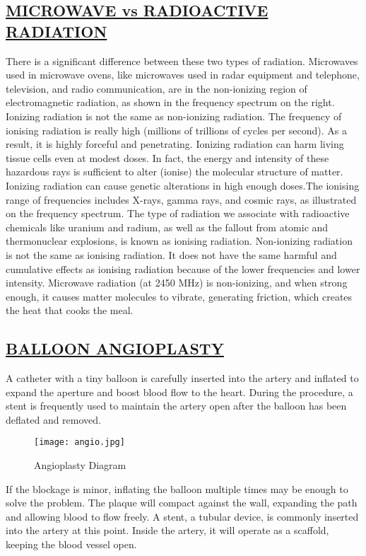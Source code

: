\documentclass[12pts]{article}
\begin{document}
\raggedright \subsection*{\underline{MICROWAVE vs RADIOACTIVE RADIATION}}
\begin{large}
There is a significant difference between these two types of radiation. Microwaves used in microwave ovens, like microwaves used in radar equipment and telephone, television, and radio communication, are in the non-ionizing region of electromagnetic radiation, as shown in the frequency spectrum on the right. Ionizing radiation is not the same as non-ionizing radiation. The frequency of ionising radiation is really high (millions of trillions of cycles per second). As a result, it is highly forceful and penetrating. Ionizing radiation can harm living tissue cells even at modest doses. In fact, the energy and intensity of these hazardous rays is sufficient to alter (ionise) the molecular structure of matter. Ionizing radiation can cause genetic alterations in high enough doses.The ionising range of frequencies includes X-rays, gamma rays, and cosmic rays, as illustrated on the frequency spectrum. The type of radiation we associate with radioactive chemicals like uranium and radium, as well as the fallout from atomic and thermonuclear explosions, is known as ionising radiation. Non-ionizing radiation is not the same as ionising radiation. It does not have the same harmful and cumulative effects as ionising radiation because of the lower frequencies and lower intensity. Microwave radiation (at 2450 MHz) is non-ionizing, and when strong enough, it causes matter molecules to vibrate, generating friction, which creates the heat that cooks the meal.
\end{large}


\raggedright  \subsection*{\underline{BALLOON ANGIOPLASTY}}

\begin{large}
\begin{flushleft}
A catheter with a tiny balloon is carefully inserted into the artery and inflated to expand the aperture and boost blood flow to the heart. During the procedure, a stent is frequently used to maintain the artery open after the balloon has been deflated and removed.

\begin{figure}[h]
\centering
\texttt{[image: angio.jpg]}
\caption{Angioplasty Diagram}
\end{figure}

If the blockage is minor, inflating the balloon multiple times may be enough to solve the problem. The plaque will compact against the wall, expanding the path and allowing blood to flow freely.
A stent, a tubular device, is commonly inserted into the artery at this point. Inside the artery, it will operate as a scaffold, keeping the blood vessel open.
\end{flushleft}
\end{large}
\end{document}
